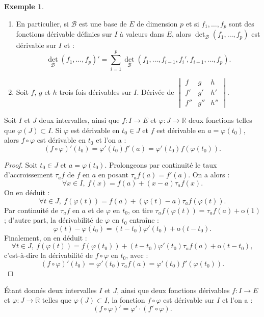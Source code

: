 \documentclass[french]{article}
\newcommand{\R}{\mathbb{R}}
\renewcommand{\o}{\text{o}}
\theoremstyle{plain}
\theoremstyle{definition}
\newtheorem*{ex}{Exemple}
\theoremstyle{remark}
\begin{document}
\begin{ex}
	\begin{enumerate}
		\item En particulier, si $\mathcal{B}$ est une base de $E$ de dimension $p$ et si $f_1,\ldots,f_p$ sont des fonctions dérivable définies sur $I$ à valeurs dans $E$, alors $\det_{\mathcal{B}}(f_1,\ldots,f_p)$ est dérivable sur $I$ et :
		$$\det_{\mathcal{B}}(f_1,\ldots,f_p)'=\sum_{i=1}^{p}\det_{\mathcal{B}}(f_1,\ldots,f_{i-1},f_i',f_{i+1},\ldots,f_p).$$
		\item Soit $f$, $g$ et $h$ trois fois dérivables sur $I$. Dérivée de $\begin{vmatrix}
			f&g&h\\
			f'&g'&h'\\
			f''&g''&h''
		\end{vmatrix}$.
	\end{enumerate}
\end{ex}

\begin{prop}%
	Soit $I$ et $J$ deux intervalles, ainsi que $f:I\to E$ et $\varphi:J\to\R$ deux fonctions telles que $\varphi(J)\subset I$. Si $\varphi$ est dérivable en $t_0\in J$ et $f$ est dérivable en $a=\varphi(t_0)$, alors $f\circ\varphi$ est dérivable en $t_0$ et l'on a :
	$$(f\circ\varphi)'(t_0)=\varphi'(t_0)f'(a)=\varphi'(t_0)f(\varphi(t_0)).$$
\end{prop}
\begin{proof}
	Soit $t_0\in J$ et $a=\varphi(t_0)$. Prolongeons par continuité le taux d'accroissement $\tau_a f$ de $f$ en $a$ en posant $\tau_af(a)=f'(a)$. On a alors :
	$$\forall x\in I,\ f(x)=f(a)+(x-a)\tau_af(x).$$
	On en déduit :
	$$\forall t\in J,\ f(\varphi(t))=f(a)+(\varphi(t)-a)\tau_af(\varphi(t)).$$
	Par continuité de $\tau_af$ en $a$ et de $\varphi$ en $t_0$, on tire $\tau_af(\varphi(t))=\tau_af(a)+\o(1)$ ; d'autre part, la dérivabilité de $\varphi$ en $t_0$ entraîne :
	$$\varphi(t)-\varphi(t_0)=(t-t_0)\varphi'(t_0)+\o(t-t_0).$$
	Finalement, on en déduit :
	$$\forall t\in J,\ f(\varphi(t))=f(\varphi(t_0))+(t-t_0)\varphi'(t_0)\tau_af(a)+\o(t-t_0),$$ c'est-à-dire la dérivabilité de $f\circ\varphi$ en $t_0$, avec :
	$$(f\circ\varphi)'(t_0)=\varphi'(t_0)\tau_af(a)=\varphi'(t_0)f'(\varphi(t_0)).$$
\end{proof}

\begin{cor}%
	Étant donnés deux intervalles $I$ et $J$, ainsi que deux fonctions dérivables $f:I\to E$ et $\varphi :J\to\R$ telles que $\varphi(J)\subset I$, la fonction $f\circ\varphi$ est dérivable sur $I$ et l'on a :
	$$(f\circ\varphi)'=\varphi'\cdot(f'\circ\varphi).$$
\end{cor}
\end{document}
